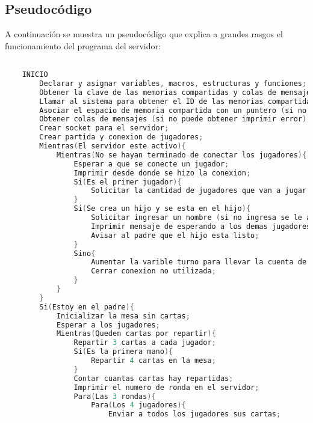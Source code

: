 \subsection{Pseudocódigo}

A continuación se muestra un pseudocódigo que explica a grandes rasgos el funcionamiento del programa del servidor:\\

\begin{lstlisting}[language=C]          

    INICIO
        Declarar y asignar variables, macros, estructuras y funciones;
        Obtener la clave de las memorias compartidas y colas de mensajes (en el caso de no obtenerlas imprimir error);
        Llamar al sistema para obtener el ID de las memorias compartidas y colas de mensajes (en el caso de que no obtenerlas imprimir error);
        Asociar el espacio de memoria compartida con un puntero (si no puede asociar imprimir error);
        Obtener colas de mensajes (si no puede obtener imprimir error);
        Crear socket para el servidor;
        Crear partida y conexion de jugadores;
        Mientras(El servidor este activo){
            Mientras(No se hayan terminado de conectar los jugadores){
                Esperar a que se conecte un jugador;
                Imprimir desde donde se hizo la conexion;
                Si(Es el primer jugador){
                    Solicitar la cantidad de jugadores que van a jugar (si no se ingresa un numero entre 2 y 4 volver a solicitar);
                }
                Si(Se crea un hijo y se esta en el hijo){
                    Solicitar ingresar un nombre (si no ingresa se le asigna un nombre por defecto);
                    Imprimir mensaje de esperando a los demas jugadores;
                    Avisar al padre que el hijo esta listo;
                }
                Sino{
                    Aumentar la varible turno para llevar la cuenta de clientes conectados;
                    Cerrar conexion no utilizada;
                }
            }
        }
        Si(Estoy en el padre){
            Inicializar la mesa sin cartas;
            Esperar a los jugadores;
            Mientras(Queden cartas por repartir){
                Repartir 3 cartas a cada jugador;
                Si(Es la primera mano){
                    Repartir 4 cartas en la mesa;
                }
                Contar cuantas cartas hay repartidas;
                Imprimir el numero de ronda en el servidor;
                Para(Las 3 rondas){
                    Para(Los 4 jugadores){
                        Enviar a todos los jugadores sus cartas;

\end{lstlisting}
